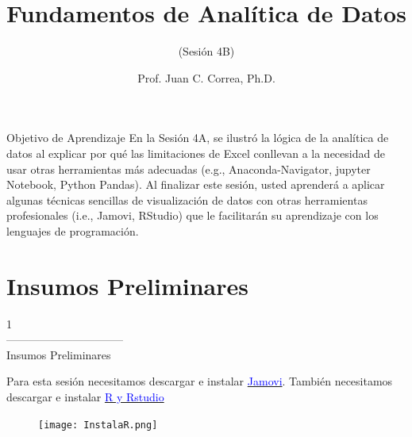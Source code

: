 \documentclass[aspectratio=169]{beamer}
\title[Fundamentos de Analítica de Datos]{Fundamentos de Analítica de Datos}
\subtitle{(Sesión 4B)}
\author[Prof. Juan C. Correa, Ph.D.]{Prof. Juan C. Correa, Ph.D.}
\institute[]{
Colegio de Estudios Superiores de Administración\\
Bogotá - Colombia\\
}
\date[Bogotá, Agosto, 2021] %
{}
\begin{document}
\begin{frame}
\titlepage
\end{frame}


\begin{frame}
\begin{block}{Objetivo de Aprendizaje}
En la Sesión 4A, se ilustró la lógica de la analítica de datos al explicar por qué las limitaciones de Excel conllevan a la necesidad de usar otras herramientas más adecuadas (e.g., Anaconda-Navigator, jupyter Notebook, Python Pandas). Al finalizar este sesión, usted aprenderá a aplicar algunas técnicas sencillas de visualización de datos con otras herramientas profesionales (i.e., Jamovi, RStudio) que le facilitarán su aprendizaje con los lenguajes de programación.
\end{block}
\end{frame}

\section{Insumos Preliminares}
\begin{frame}
\begin{center}
\Huge
\textcolor{azulcesaclaro}{1\\
--------------------------------\\
Insumos Preliminares}
\end{center}
\end{frame}

\begin{frame}
Para esta sesión necesitamos descargar e instalar \href{https://www.jamovi.org/}{\textcolor{blue}{Jamovi}}. También necesitamos descargar e instalar  \href{https://youtu.be/Bg2LzHmPZFY}{\textcolor{blue}{R y Rstudio}}
\begin{figure}
    \centering
    \texttt{[image: InstalaR.png]}
\end{figure}
\end{frame}
\end{document}
